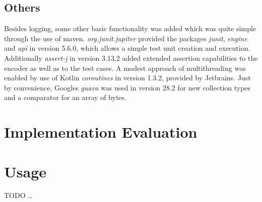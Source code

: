 \subsection{Others}
\label{ch:Implementation:sec:Impl:subsec:libs:others}
\par{
Besides logging, some other basic functionality was added which was quite simple through the use of maven. \emph{org.junit.jupiter} provided the packages \emph{junit}, \emph{engine} and \emph{api} in version 5.6.0, which allows a simple test unit creation and execution. Additionally \emph{assert-j} in version 3.13.2 added extended assertion capabilities to the encoder as well as to the test cases. A modest approach of multithreading was enabled by use of Kotlin \emph{coroutines} in version 1.3.2, provided by Jetbrains. Just by convenience, Googles \emph{guava} was used in version 28.2 for new collection types and a comparator for an array of bytes.
}


\section{Implementation Evaluation}
\label{ch:Implementation:sec:Implementation Evaluation}



\section{Usage}
\label{ch:Implementation:sec:usage}
TODO
\ldots
